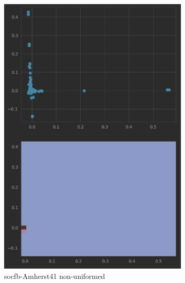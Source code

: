 \begin{figure}
    \begin{subfigure}{0.49\textwidth}
      \centering
      \includegraphics[width=\linewidth]{figures/real_diffmap_plot_nonuniformed.png}
      \caption{socfb-Amherst41 non-uniformed}
      \label{fig:sub3}
    \end{subfigure}
    \hfill
    \begin{subfigure}{0.49\textwidth}
      \centering

\end{subfigure}
\end{figure}
